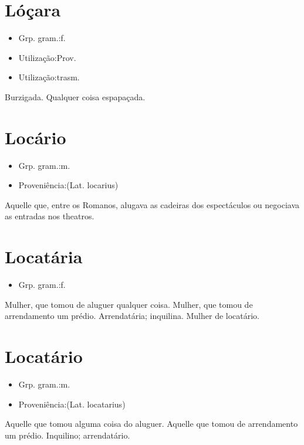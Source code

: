 \section{Lóçara}
\begin{itemize}
\item {Grp. gram.:f.}
\end{itemize}
\begin{itemize}
\item {Utilização:Prov.}
\end{itemize}
\begin{itemize}
\item {Utilização:trasm.}
\end{itemize}
Burzigada.
Qualquer coisa espapaçada.
\section{Locário}
\begin{itemize}
\item {Grp. gram.:m.}
\end{itemize}
\begin{itemize}
\item {Proveniência:(Lat. \textunderscore locarius\textunderscore )}
\end{itemize}
Aquelle que, entre os Romanos, alugava as cadeiras dos espectáculos ou negociava as entradas nos theatros.
\section{Locatária}
\begin{itemize}
\item {Grp. gram.:f.}
\end{itemize}
Mulher, que tomou de aluguer qualquer coisa.
Mulher, que tomou de arrendamento um prédio.
Arrendatária; inquilina.
Mulher de locatário.
\section{Locatário}
\begin{itemize}
\item {Grp. gram.:m.}
\end{itemize}
\begin{itemize}
\item {Proveniência:(Lat. \textunderscore locatarius\textunderscore )}
\end{itemize}
Aquelle que tomou alguma coisa do aluguer.
Aquelle que tomou de arrendamento um prédio.
Inquilino; arrendatário.
